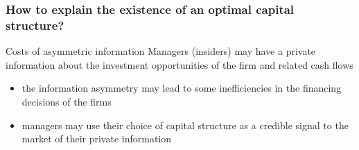 \documentclass[blue]{beamer}
\theoremstyle{definition}
\theoremstyle{example}
\begin{document}

\begin{frame}\frametitle{How to explain the existence of an optimal capital structure?}

\begin{block}{Costs of asymmetric information}
Managers (insiders) may have a private information about the investment opportunities of the firm and related cash flows
\begin{itemize}
\item the information asymmetry may lead to some inefficiencies in the financing decisions of the firms
\item managers may use their choice of capital structure as a credible signal to the market of their private information
\end{itemize}
\end{block}

\end{frame}
\end{document}
